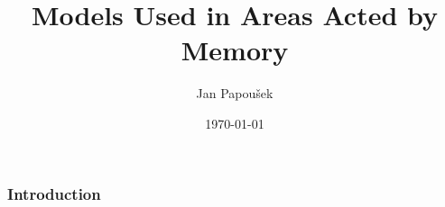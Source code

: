 \documentclass[xcolor=svgnames]{beamer}
\title[Models]{Models Used in Areas Acted by Memory}
\author{Jan Papou\v{s}ek}
\institute{Masaryk University Brno}
\date{\today}
\begin{document}
\frame[plain]{\titlepage}
\begin{frame}
	\frametitle{Introduction}
\end{frame}
\end{document}
